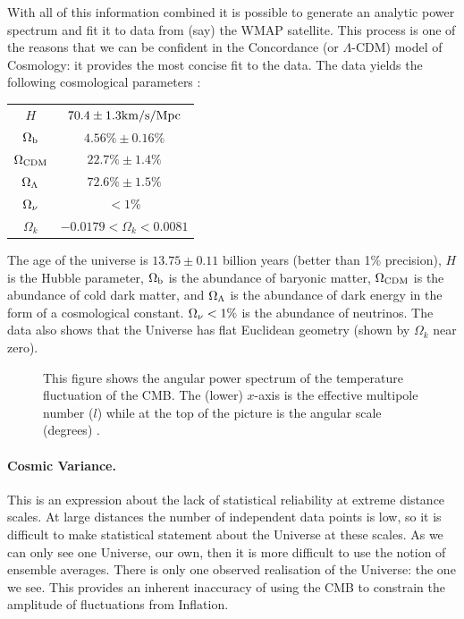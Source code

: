 With all of this information combined it is possible to generate an analytic power spectrum and fit it to data from (say) the WMAP satellite. This process is one of the reasons that we can be confident in the Concordance (or $\Lambda$-CDM) model of Cosmology: it provides the most concise fit to the data. The data yields the following cosmological parameters \citep{bib_wmap7}:

\vspace*{1cm}
\begin{center}
\begin{tabular}{|c|c|}
  \hline
  $H$ &  $70.4 \pm 1.3 {\rm km/s / Mpc}$    \\
  $\Omega_{\rm b} $ & $ 4.56\%  \pm  0.16\%$ \\
  $\Omega_{\rm CDM} $ & $ 22.7\%  \pm  1.4\%$     \\
  $\Omega_{\rm \Lambda} $ & $ 72.6\%  \pm  1.5\%$  \\ 
  $\Omega_{\rm \nu} $ & $ < 1\%$ \\
  $\Omega_k$ & $ -0.0179 < \Omega_k < 0.0081$  \\
  \hline
\end{tabular}
\end{center}
\vspace*{1cm}

The age of the universe is $13.75 \pm 0.11$ billion years (better than 1\% precision), $H$ is the Hubble parameter, $\Omega_{\rm b}$ is the abundance of baryonic matter, $\Omega_{\rm CDM}$ is the abundance of cold dark matter, and $\Omega_{\rm \Lambda}$ is the abundance of dark energy in the form of a cosmological constant. $\Omega_{\rm \nu} < 1\%$ is the abundance of neutrinos. The data also shows that the Universe has flat Euclidean geometry (shown by $\Omega_k$ near zero).


\begin{figure}[htb]
   \begin{center}
     \leavevmode
                \epsfxsize=150mm

   \end{center}
\caption{This figure shows the angular power spectrum of the temperature fluctuation of the CMB. The (lower) $x$-axis is the effective multipole number ($l$) while at the top of the picture is the angular scale (degrees) \citep{bib_wright}.}
\label{fig.ang_power}
\end{figure}


\paragraph{Cosmic Variance.}
This is an expression about the lack of statistical reliability at extreme distance scales. At large distances the number of independent data points is low, so it is difficult to make statistical statement about the Universe at these scales. As we can only see one Universe, our own, then it is more difficult to use the notion of ensemble averages. There is only one observed realisation of the Universe: the one we see. This provides an inherent inaccuracy of using the CMB to constrain the amplitude of fluctuations from Inflation.


